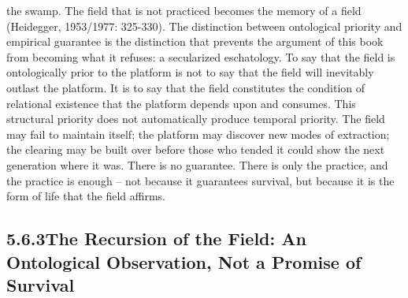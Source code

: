 the swamp. The field that is not practiced becomes the memory of a field (Heidegger, 1953/1977: 325-330). The distinction between ontological priority and empirical guarantee is the distinction that prevents the argument of this book from becoming what it refuses: a secularized eschatology. To say that the field is ontologically prior to the platform is not to say that the field will inevitably outlast the platform. It is to say that the field constitutes the condition of relational existence that the platform depends upon and consumes. This structural priority does not automatically produce temporal priority. The field may fail to maintain itself; the platform may discover new modes of extraction; the clearing may be built over before those who tended it could show the next generation where it was. There is no guarantee. There is only the practice, and the practice is enough – not because it guarantees survival, but because it is the form of life that the field affirms.

\subsection{5.6.3\quad The Recursion of the Field: An Ontological Observation, Not a Promise of Survival}

